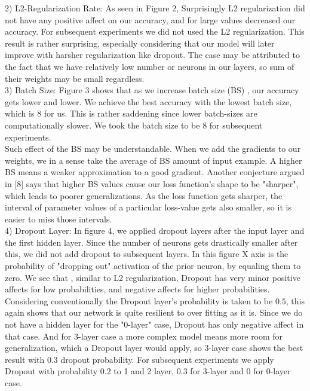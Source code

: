 \documentclass[conference,compsoc]{IEEEtran}
\begin{document}
2) L2-Regularization Rate: As seen in Figure 2, Surprisingly L2 regularization did not have any positive affect  on our accuracy, and for large values decreased our accuracy. For subsequent experiments we did not used the L2 regularization. This result is rather surprising, especially considering that our model will later improve with harsher regularization like dropout. The case may be attributed to the fact that we have relatively low number or neurons in our layers, so sum of their weights may be small regardless. \\

3) Batch Size: Figure 3 shows that as we increase batch size (BS) , our accuracy gets lower and lower. We achieve the best accuracy with the lowest batch size, which is $8$ for us. This is rather saddening since lower batch-sizes are computationally slower. We took the batch size to be $8$ for subsequent experiments. \\ 

Such effect of the BS may be understandable. When we add the gradients to our weights, we in a sense take the average of BS amount of input example. A higher BS means a weaker approximation to a good gradient. Another conjecture argued in [8] says that higher BS values cause our loss function's shape to be "sharper", which leads to poorer generalizations. As the loss function gets sharper, the interval of parameter values of a particular loss-value gets also smaller, so it is easier to miss those intervals. \\

4) Dropout Layer: In figure 4, we applied dropout layers after the input layer and the first hidden layer. Since the number of neurons gets drastically smaller after this, we did not add dropout to subsequent layers. In this figure X axis is the probability of "dropping out" activation of the prior neuron, by equaling them to zero. We see that , similar to L2 regularization, Dropout has very minor positive affects for low probabilities, and negative affects for higher probabilities. Considering conventionally the Dropout layer's probability is taken to be $0.5$, this again shows that our network is quite resilient to over fitting as it is. Since we do not have a hidden layer for the "0-layer" case, Dropout has only negative affect in that case. And for 3-layer case a more complex model means more room for generalization, which a Dropout layer would apply, so 3-layer case shows the best result with $0.3$ dropout probability. For subsequent experiments we apply Dropout with probability $0.2$ to 1 and 2 layer, $0.3$ for 3-layer and $0$ for 0-layer case. \\
\end{document}
